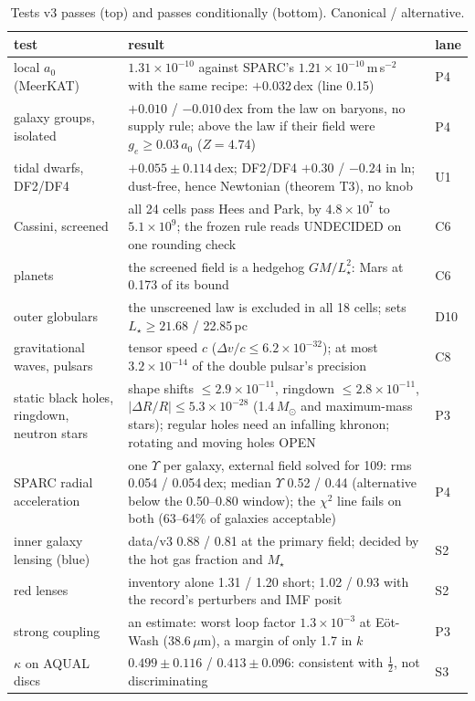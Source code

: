 \documentclass[10pt]{article}
\begin{document}
\begin{table}[t]\centering\small
\caption{Tests v3 passes (top) and passes conditionally (bottom). Canonical / alternative.}\label{tab:pass}
\begin{tabular}{p{}p{}l}
\toprule
test & result & lane\\
\midrule
local $a_0$ (MeerKAT) & $1.31\times10^{-10}$ against SPARC's $1.21\times10^{-10}$\,m\,s$^{-2}$ with the same recipe: $+0.032$\,dex (line 0.15) & P4\\
galaxy groups, isolated & $+0.010$ / $-0.010$\,dex from the law on baryons, no supply rule; above the law if their field were $g_e\ge0.03\,a_0$ ($Z=4.74$) & P4\\
tidal dwarfs, DF2/DF4 & $+0.055\pm0.114$\,dex; DF2/DF4 $+0.30$ / $-0.24$ in ln; dust-free, hence Newtonian (theorem T3), no knob & U1\\
Cassini, screened & all 24 cells pass Hees and Park, by $4.8\times10^{7}$ to $5.1\times10^{9}$; the frozen rule reads UNDECIDED on one rounding check & C6\\
planets & the screened field is a hedgehog $GM/L_\star^2$: Mars at 0.173 of its bound & C6\\
outer globulars & the unscreened law is excluded in all 18 cells; sets $L_\star\ge21.68$ / 22.85\,pc & D10\\
gravitational waves, pulsars & tensor speed $c$ ($\Delta v/c\le6.2\times10^{-32}$); at most $3.2\times10^{-14}$ of the double pulsar's precision & C8\\
static black holes, ringdown, neutron stars & shape shifts $\le2.9\times10^{-11}$, ringdown $\le2.8\times10^{-11}$, $|\Delta R/R|\le5.3\times10^{-28}$ (1.4\,$M_\odot$ and maximum-mass stars); regular holes need an infalling khronon; rotating and moving holes OPEN & P3\\
\midrule
SPARC radial acceleration & one $\Upsilon$ per galaxy, external field solved for 109: rms 0.054 / 0.054\,dex; median $\Upsilon$ 0.52 / 0.44 (alternative below the 0.50--0.80 window); the $\chi^2$ line fails on both (63--64\% of galaxies acceptable) & P4\\
inner galaxy lensing (blue) & data/v3 0.88 / 0.81 at the primary field; decided by the hot gas fraction and $M_\star$ & S2\\
red lenses & inventory alone 1.31 / 1.20 short; 1.02 / 0.93 with the record's perturbers and IMF posit & S2\\
strong coupling & an estimate: worst loop factor $1.3\times10^{-3}$ at E\"ot-Wash (38.6\,$\mu$m), a margin of only 1.7 in $k$ & P3\\
$\kappa$ on AQUAL discs & $0.499\pm0.116$ / $0.413\pm0.096$: consistent with $\tfrac12$, not discriminating & S3\\
\bottomrule
\end{tabular}
\end{table}
\end{document}

